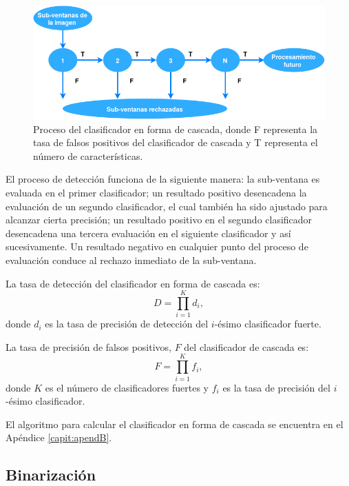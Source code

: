 \begin{figure}[h!]
\begin{center}
\includegraphics[scale=.60]{./Figures/DCascade.png}
\end{center}
\caption{Proceso del clasificador en forma de cascada, donde F representa la tasa de falsos positivos del clasificador de cascada y T representa el n\'umero de características.}
\label{fig:Cascade}
\end{figure}

El proceso de detección funciona de la siguiente manera: la sub-ventana es evaluada en el primer clasificador; un resultado positivo desencadena la evaluación de un segundo clasificador, el cual también ha sido ajustado para alcanzar cierta precisión; un resultado positivo en el segundo clasificador desencadena una tercera evaluación en el siguiente clasificador y así sucesivamente. Un resultado negativo en cualquier punto del proceso de evaluación conduce al rechazo inmediato de la sub-ventana.

La tasa de detección del clasificador en forma de cascada es: 
\begin{equation} \label{eq:D}
D = \prod^K_{i=1} d_i ,
\end{equation}
donde $d_i$ es la tasa de precisión de detección del $i$-ésimo clasificador fuerte.  

La tasa de precisión de falsos positivos, $F$ del clasificador de cascada es: 
\begin{equation} \label{eq:F}
F = \prod^K_{i=1} f_i ,
\end{equation}
donde $K$ es el número de clasificadores fuertes y $f_i$ es la tasa de precisión del $i$-ésimo clasificador. 
 
El algoritmo para calcular el clasificador en forma de cascada se encuentra en el Apéndice \ref{capit:apendB}. 

\subsection{Binarización}\label{subsec:Binarization} 

